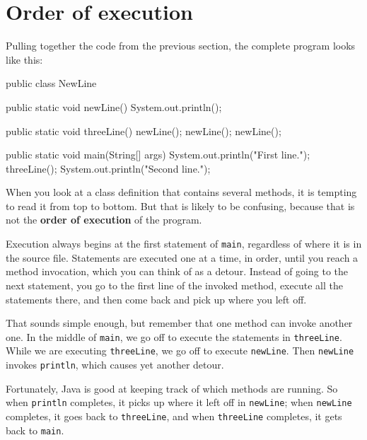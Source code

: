 \documentclass[12pt]{book}
\theoremstyle{exercise}
\newcommand{\java}[1]{\verb"#1"}
\begin{document}


\section{Order of execution}


Pulling together the code from the previous section, the complete program looks like this:

\begin{code}
public class NewLine {

    public static void newLine() {
        System.out.println();
    }

    public static void threeLine() {
        newLine();
        newLine();
        newLine();
    }

    public static void main(String[] args) {
        System.out.println("First line.");
        threeLine();
        System.out.println("Second line.");
    }
}
\end{code}


When you look at a class definition that contains several methods, it is tempting to read it from top to bottom.
But that is likely to be confusing, because that is not the {\bf order of execution} of the program.

Execution always begins at the first statement of \java{main}, regardless of where it is in the source file.
Statements are executed one at a time, in order, until you reach a method invocation, which you can think of as a detour.
Instead of going to the next statement, you go to the first line of the invoked method, execute all the statements there, and then come back and pick up where you left off.

That sounds simple enough, but remember that one method can invoke another one.
In the middle of \java{main}, we go off to execute the statements in \java{threeLine}.
While we are executing \java{threeLine}, we go off to execute \java{newLine}.
Then \java{newLine} invokes \java{println}, which causes yet another detour.

Fortunately, Java is good at keeping track of which methods are running.
So when \java{println} completes, it picks up where it left off in \java{newLine}; when \java{newLine} completes, it goes back to \java{threeLine}, and when \java{threeLine} completes, it gets back to \java{main}.
\end{document}
